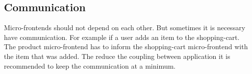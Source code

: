 \subsection{Communication}

Micro-frontends should not depend on each other. But sometimes it is necessary have communication. For example if a user adds an item to the shopping-cart. The product micro-frontend has to inform the shopping-cart micro-frontend with the item that was added. The reduce the coupling between application it is recommended to keep the communication at a minimum.